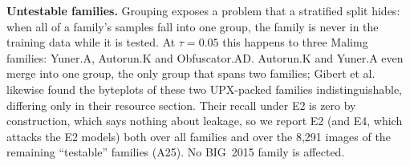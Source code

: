\documentclass[conference]{IEEEtran}
\begin{document}
\textbf{Untestable families.} Grouping exposes a problem that a stratified split
hides: when all of a family's samples fall into one group, the family is never in the
training data while it is tested.
At $\tau = 0.05$ this happens to three Malimg families: Yuner.A,
Autorun.K and Obfuscator.AD. Autorun.K and Yuner.A even merge into one group, the only
group that spans two families; Gibert et al.~\cite{gibert2019cnn} likewise found the
byteplots of these two UPX-packed families indistinguishable, differing only in their
resource section. Their recall under E2 is zero by construction, which
says nothing about leakage, so we report E2 (and E4, which attacks the E2 models) both
over all families and over the 8,291 images of the remaining
``testable'' families (A25). No BIG~2015 family is affected.
\end{document}
